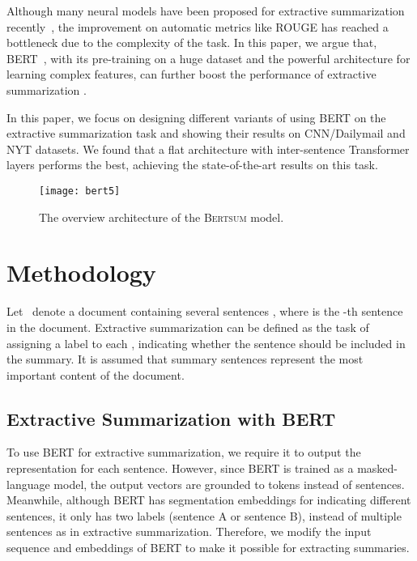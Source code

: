 \documentclass[11pt,a4paper]{article}
\begin{document}
    Although many neural models have been proposed for extractive summarization recently~\citep{cheng2016neural,nallapati2017summarunner,narayan2018ranking, dong2018banditsum, zhang2018neural, zhou2018neural}, the improvement on automatic metrics like ROUGE has reached a bottleneck due to the complexity of the task.
       In this paper, we argue that,  BERT~\citep{devlin2018bert}, with its pre-training on a huge dataset and the powerful architecture for learning complex features, can further boost the performance of extractive summarization .
    
    In this paper, we focus on designing different variants of using BERT on the extractive summarization task and showing their results on CNN/Dailymail and NYT datasets.
    We found that a flat architecture with inter-sentence Transformer layers performs the best, achieving the state-of-the-art results on this task.
    
    
    \begin{figure*}[t]
        \centering
        \texttt{[image: bert5]}
        \label{trans}
        \caption{The overview  architecture of the \textsc{Bertsum} model.}
    \end{figure*}
    
    
    
    
    \section{Methodology}
    
    
    
    
Let ~denote a document containing several sentences
    , where  is the -th
    sentence in the document.  Extractive summarization can be defined as
    the task of assigning a label  to each ,
    indicating whether the sentence should be included in the summary. It
    is assumed that summary sentences represent the most important content    of the document.
    
    \subsection{Extractive Summarization with BERT}
    
    To use BERT for extractive summarization, we require it to output the representation for each sentence. However, since BERT is trained as a masked-language model, the output vectors are grounded to tokens instead of sentences. Meanwhile, although BERT has segmentation embeddings for indicating different sentences, it only has two labels (sentence A or sentence B), instead of multiple sentences as in extractive summarization.
    Therefore, we modify the input sequence and embeddings of  BERT to make it possible for extracting summaries.
    
\end{document}
